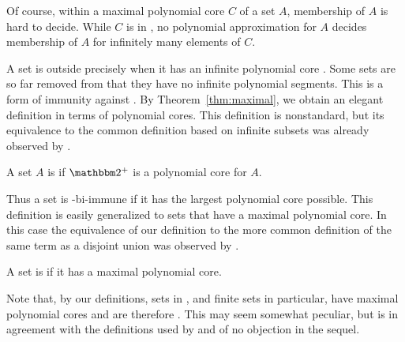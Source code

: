 Of course, within a maximal polynomial core $C$ of a set $A$, membership of $A$ is hard to decide.
While $C$ is in , no polynomial approximation for $A$ decides membership of $A$ for infinitely many elements of $C$.

A set is outside  precisely when it has an infinite polynomial core \parencite{lynch1975reducibility}.
Some sets are so far removed from  that they have no infinite polynomial segments.
This is a form of immunity against .
By Theorem~\ref{thm:maximal}, we obtain an elegant definition in terms of polynomial cores.
This definition is nonstandard, but its equivalence to the common definition based on infinite subsets was already observed by \textcite{balcazar1985bi-immune} \parencite[see also][]{book1988polynomial}.
\begin{definition}
  A set $A$ is  if $\binary^+$ is a polynomial core for $A$.
\end{definition}

Thus a set is -bi-immune if it has the largest polynomial core possible.
This definition is easily generalized to sets that have a maximal polynomial core.
In this case the equivalence of our definition to the more common definition of the same term as a disjoint union was observed by \textcite{orponen1986classification}.
\begin{definition}
  A set is  if it has a maximal polynomial core.
\end{definition}
Note that, by our definitions, sets in , and finite sets in particular, have maximal polynomial cores and are therefore .
This may seem somewhat peculiar, but is in agreement with the definitions used by \textcite{orponen1986classification} and of no objection in the sequel.

